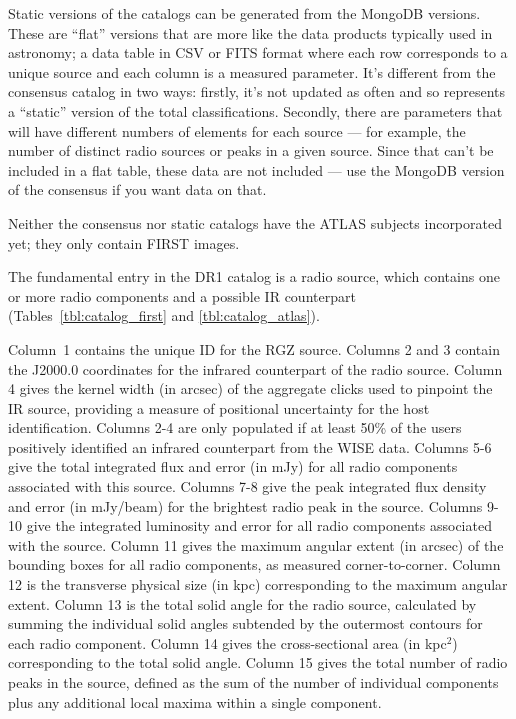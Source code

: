 \documentclass[a4,useAMS,usenatbib]{mn2e}
\begin{document}
Static versions of the catalogs can be generated from the MongoDB versions. These are ``flat'' versions that are more like the data products typically used in astronomy; a data table in CSV or FITS format where each row corresponds to a unique source and each column is a measured parameter. It's different from the consensus catalog in two ways: firstly, it's not updated as often and so represents a ``static'' version of the total classifications. Secondly, there are parameters that will have different numbers of elements for each source --- for example, the number of distinct radio sources or peaks in a given source. Since that can't be included in a flat table, these data are not included --- use the MongoDB version of the consensus if you want data on that. 
 
Neither the consensus nor static catalogs have the ATLAS subjects incorporated yet; they only contain FIRST images.

The fundamental entry in the DR1 catalog is a radio source, which contains one or more radio components and a possible IR counterpart (Tables~\ref{tbl:catalog_first} and \ref{tbl:catalog_atlas}). 

Column~1 contains the unique ID for the RGZ source. Columns 2 and 3 contain the J2000.0 coordinates for the infrared counterpart of the radio source. Column 4 gives the kernel width (in arcsec) of the aggregate clicks used to pinpoint the IR source, providing a measure of positional uncertainty for the host identification. Columns 2-4 are only populated if at least 50\% of the users positively identified an infrared counterpart from the WISE data. Columns 5-6 give the total integrated flux and error (in mJy) for all radio components associated with this source. Columns 7-8 give the peak integrated flux density and error (in mJy/beam) for the brightest radio peak in the source. Columns 9-10 give the integrated luminosity and error for all radio components associated with the source. Column 11 gives the maximum angular extent (in arcsec) of the bounding boxes for all radio components, as measured corner-to-corner. Column 12 is the transverse physical size (in kpc) corresponding to the maximum angular extent. Column 13 is the total solid angle for the radio source, calculated by summing the individual solid angles subtended by the outermost contours for each radio component. Column 14 gives the cross-sectional area (in kpc$^2$) corresponding to the total solid angle. Column 15 gives the total number of radio peaks in the source, defined as the sum of the number of individual components plus any additional local maxima within a single component. 
\end{document}
